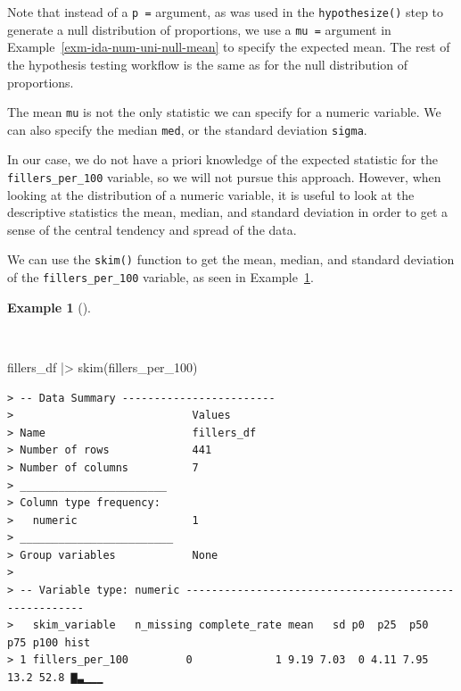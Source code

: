 \documentclass[
  letterpaper,
  DIV=11,
  numbers=noendperiod]{scrreprt}
\newenvironment{Shaded}{\begin{snugshade}}{\end{snugshade}}
\newcommand{\FunctionTok}[1]{\textcolor[rgb]{0.00,0.00,0.00}{#1}}
\newcommand{\NormalTok}[1]{\textcolor[rgb]{0.00,0.00,0.00}{#1}}
\newcommand{\SpecialCharTok}[1]{\textcolor[rgb]{0.00,0.00,0.00}{#1}}
\theoremstyle{definition}
\newtheorem{example}{Example}[chapter]
\theoremstyle{remark}
\begin{document}
Note that instead of a \texttt{p\ =} argument, as was used in the
\texttt{hypothesize()} step to generate a null distribution of
proportions, we use a \texttt{mu\ =} argument in
Example~\ref{exm-ida-num-uni-null-mean} to specify the expected mean.
The rest of the hypothesis testing workflow is the same as for the null
distribution of proportions.

\begin{tcolorbox}[enhanced jigsaw, leftrule=.75mm, colframe=quarto-callout-color-frame, colback=white, rightrule=.15mm, opacityback=0, arc=.35mm, breakable, bottomrule=.15mm, left=2mm, toprule=.15mm]

The mean \texttt{mu} is not the only statistic we can specify for a
numeric variable. We can also specify the median \texttt{med}, or the
standard deviation \texttt{sigma}.

\end{tcolorbox}

In our case, we do not have a priori knowledge of the expected statistic
for the \texttt{fillers\_per\_100} variable, so we will not pursue this
approach. However, when looking at the distribution of a numeric
variable, it is useful to look at the descriptive statistics the mean,
median, and standard deviation in order to get a sense of the central
tendency and spread of the data.

We can use the \texttt{skim()} function to get the mean, median, and
standard deviation of the \texttt{fillers\_per\_100} variable, as seen
in Example~\ref{exm-ida-num-uni-summary}.

\begin{example}[]\protect\hypertarget{exm-ida-num-uni-summary}{}\label{exm-ida-num-uni-summary}

~

\begin{Shaded}
\begin{Highlighting}[]
\NormalTok{fillers\_df }\SpecialCharTok{|\textgreater{}}
  \FunctionTok{skim}\NormalTok{(fillers\_per\_100)}
\end{Highlighting}
\end{Shaded}

\begin{verbatim}
> -- Data Summary ------------------------
>                            Values    
> Name                       fillers_df
> Number of rows             441       
> Number of columns          7         
> _______________________              
> Column type frequency:               
>   numeric                  1         
> ________________________             
> Group variables            None      
> 
> -- Variable type: numeric ------------------------------------------------------
>   skim_variable   n_missing complete_rate mean   sd p0  p25  p50  p75 p100 hist 
> 1 fillers_per_100         0             1 9.19 7.03  0 4.11 7.95 13.2 52.8 ▇▃▁▁▁
\end{verbatim}

\end{example}
\end{document}

